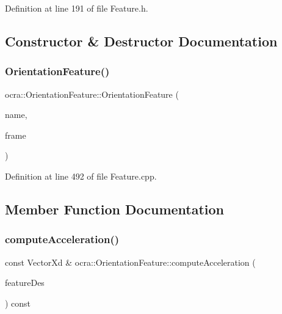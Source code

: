 Definition at line 191 of file Feature.\+h.



\subsection{Constructor \& Destructor Documentation}
\hypertarget{classocra_1_1OrientationFeature_acea2f5647dd31094ff4e83a77a89fdd8}{}\label{classocra_1_1OrientationFeature_acea2f5647dd31094ff4e83a77a89fdd8} 
\subsubsection{\texorpdfstring{Orientation\+Feature()}{OrientationFeature()}}
{\footnotesize\ttfamily ocra\+::\+Orientation\+Feature\+::\+Orientation\+Feature (\begin{DoxyParamCaption}\item[{const std\+::string \&}]{name,  }\item[{Control\+Frame\+::\+Ptr}]{frame }\end{DoxyParamCaption})}



Definition at line 492 of file Feature.\+cpp.



\subsection{Member Function Documentation}
\hypertarget{classocra_1_1OrientationFeature_af5ccb1a3d72b23bc0498c357303fe0e2}{}\label{classocra_1_1OrientationFeature_af5ccb1a3d72b23bc0498c357303fe0e2} 
\subsubsection{\texorpdfstring{compute\+Acceleration()}{computeAcceleration()}\hspace{0.1cm}{\footnotesize\ttfamily [1/2]}}
{\footnotesize\ttfamily const Vector\+Xd \& ocra\+::\+Orientation\+Feature\+::compute\+Acceleration (\begin{DoxyParamCaption}\item[{const \hyperlink{classocra_1_1Feature}{Feature} \&}]{feature\+Des }\end{DoxyParamCaption}) const\hspace{0.3cm}{\ttfamily [virtual]}}




